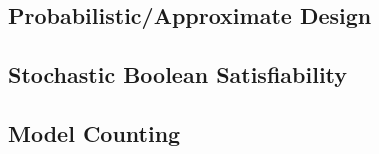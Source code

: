 \subsection{Probabilistic/Approximate Design}

\subsection{Stochastic Boolean Satisfiability}
\subsection{Model Counting}